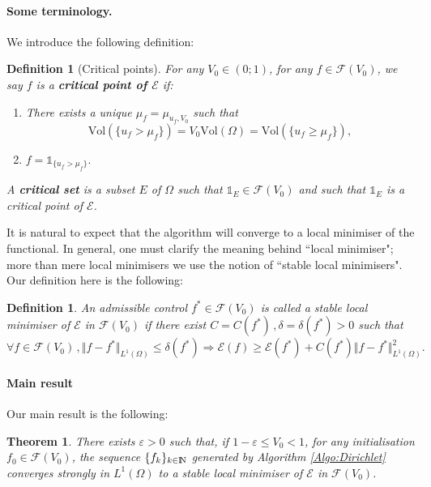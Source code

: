 \documentclass{article}
\newcommand{\N}{\textnormal{I\kern-0.21emN}}
\renewcommand{\geq}{\geqslant}
\renewcommand{\leq}{\leqslant}
\def\e{{\varepsilon}}
\newtheorem{theorem}{Theorem}\renewcommand\thetheorem{\Roman{theorem}}
\newtheorem{proposition}[material]{Proposition}
\newtheorem{definition}[material]{Definition}
\def\O{{\Omega}}
\numberwithin{equation}{section}
\begin{document}
\paragraph{Some terminology.}
 We introduce the following definition:
\begin{definition}[Critical points]\label{De:CriticalPoint}
For any $V_0\in (0;1)$, for any $f\in \mathcal F(V_0)$, we say $f$ is a \textbf{critical point of $\mathscr E$} if:
\begin{enumerate}
\item There exists a unique $\mu_f=\mu_{u_f,V_0}$ such that 
\[ \mathrm{Vol}(\{u_f>\mu_f\})=V_0\mathrm{Vol}(\O)=\mathrm{Vol}(\{u_f\geq \mu_f\}),\]
\item $f=\mathds 1_{\{u_f>\mu_f\}}.$
\end{enumerate}
A \textbf{critical set} is a subset $E$ of $\O$ such that $\mathds 1_E\in \mathcal F(V_0)$ and such that $\mathds 1_E$ is a critical point of $\mathscr E$.
\end{definition}

It is natural to expect that the algorithm will converge to a local minimiser of the functional. In general, one must clarify the meaning behind ``local minimiser"; more than mere local minimisers we use the notion of ``stable local minimisers". Our definition here is the following:
\begin{definition}\label{De:LocalMinimiserDirichlet}
An admissible control $f^*\in \mathcal F(V_0)$ is called a stable local minimiser of $\mathscr E$ in $\mathcal F(V_0)$ if there exist $C=C(f^*)\,, \delta=\delta(f^*)>0$ such that 
\[ \forall f\in \mathcal F(V_0)\,, \Vert f-f^*\Vert_{L^1(\O)}\leq \delta(f^*)\Rightarrow \mathscr E(f)\geq \mathscr E(f^*)+C(f^*)\Vert f-f^*\Vert_{L^1(\O)}^2.\]
\end{definition}

\paragraph{Main result}
Our main result is the following:
\begin{theorem}\label{Th:Dirichlet}
There exists $\e>0$ such that, if $1-\e\leq V_0<1$, for any initialisation $f_0\in \mathcal F(V_0)$, the sequence $\{f_k\}_{k\in \N}$ generated by Algorithm \ref{Algo:Dirichlet} converges strongly in $L^1(\O)$ to a stable local minimiser of $\mathscr E$ in $\mathcal F(V_0)$.
\end{theorem}

\end{document}
